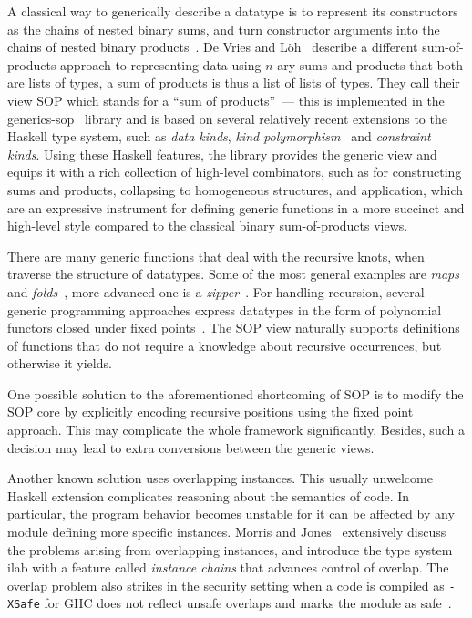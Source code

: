 \documentclass[runningheads]{llncs}
\begin{document}
A classical way to generically describe a datatype is to represent its constructors as the chains of nested binary sums, and turn constructor arguments into the chains of nested binary products~\cite{VanNoort2008,Cheney2002,Loeh2004}\nocite{Rodriguez2008}\nocite{Magalhaes2012}. De Vries and L\"{o}h~\cite{VriLoeh2014} describe a different sum-of-products approach to representing data using $n$-ary sums and products that both are lists of types, a sum of products is thus a list of lists of types. They call their view SOP which stands for a ``sum of products''~--- this is implemented in the \textsf{generics-sop}~\cite{generics-sop} library and is based on several relatively recent extensions to the Haskell type system, such as \emph{data kinds}, \emph{kind polymorphism}~\cite{Yorgey2012} and \emph{constraint kinds}.
Using these Haskell features, the library provides the generic view and equips it with a rich collection of high-level combinators, such as for constructing sums and products, collapsing to homogeneous structures, and application, which are an expressive instrument for defining generic functions in a more succinct and high-level style compared to the classical binary sum-of-products views.

There are many generic functions that deal with the recursive knots, when traverse the structure of datatypes. Some of the most general examples are \emph{maps}~\cite{Magalhaes2010} and \emph{folds}~\cite{Meijer1991}, more advanced one is a \emph{zipper}~\cite{Huet1997,HiJeLo2004,Adams2010}. For handling recursion, several generic programming approaches express datatypes in the form of polynomial functors closed under fixed points~\cite{MuRec2009,Jansson1997,Loeh2011}. The SOP view naturally supports definitions of functions that do not require a knowledge about recursive occurrences, but otherwise it yields. 

One possible solution to the aforementioned shortcoming of SOP is to modify the SOP core by explicitly encoding recursive positions using the fixed point approach. This may complicate the whole framework significantly. Besides, such a decision may lead to extra conversions between the generic views.

Another known solution uses overlapping instances. This usually unwelcome Haskell extension complicates reasoning about the semantics of code. In particular, the program behavior becomes unstable for it can be affected by any module defining more specific instances. Morris and Jones~\cite{Morris2010} extensively discuss the problems arising from overlapping instances, and introduce the type system \textsf{ilab} with a feature called \emph{instance chains} that advances control of overlap. The overlap problem also strikes in the security setting when a code is compiled as \texttt{-XSafe} for GHC does not reflect unsafe overlaps and marks the module as safe~\cite{sh-overlapping}.
\end{document}
